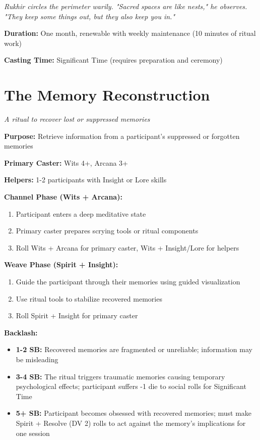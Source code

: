 \documentclass[12pt,twoside]{book}
\newcommand{\shadow}[1]{\textit{#1}}
\begin{document}
\shadow{Rukhir circles the perimeter warily. "Sacred spaces are like nests," he observes. "They keep some things out, but they also keep you in."}

\textbf{Duration:} One month, renewable with weekly maintenance (10 minutes of ritual work)

\textbf{Casting Time:} Significant Time (requires preparation and ceremony)

\section*{The Memory Reconstruction}
\textit{A ritual to recover lost or suppressed memories}

\textbf{Purpose:} Retrieve information from a participant's suppressed or forgotten memories

\textbf{Primary Caster:} Wits 4+, Arcana 3+

\textbf{Helpers:} 1-2 participants with Insight or Lore skills

\textbf{Channel Phase (Wits + Arcana):}
\begin{enumerate}
\item Participant enters a deep meditative state
\item Primary caster prepares scrying tools or ritual components
\item Roll Wits + Arcana for primary caster, Wits + Insight/Lore for helpers
\end{enumerate}

\textbf{Weave Phase (Spirit + Insight):}
\begin{enumerate}
\item Guide the participant through their memories using guided visualization
\item Use ritual tools to stabilize recovered memories
\item Roll Spirit + Insight for primary caster
\end{enumerate}

\textbf{Backlash:}
\begin{itemize}
\item \textbf{1-2 SB:} Recovered memories are fragmented or unreliable; information may be misleading
\item \textbf{3-4 SB:} The ritual triggers traumatic memories causing temporary psychological effects; participant suffers -1 die to social rolls for Significant Time
\item \textbf{5+ SB:} Participant becomes obsessed with recovered memories; must make Spirit + Resolve (DV 2) rolls to act against the memory's implications for one session
\end{itemize}
\end{document}
